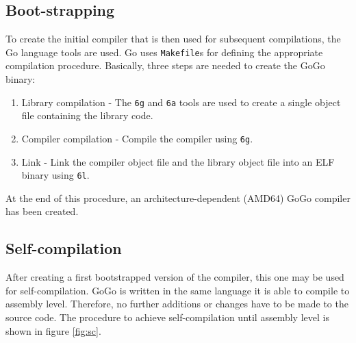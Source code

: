 \documentclass[a4paper]{scrartcl}
\let\section\subsection
\let\subsection\subsubsection
\let\subsubsection\paragraph
\let\paragraph\subparagraph
\let\subparagraph\undefined
\begin{document}
    \section{Boot-strapping}
      To create the initial compiler that is then used for subsequent 
      compilations, the Go language tools are used. Go uses \texttt{Makefile}s 
      for defining the appropriate compilation procedure. Basically, three steps 
      are needed to create the GoGo binary:      
      \begin{enumerate}
        \item Library compilation - The \texttt{6g} and \texttt{6a} tools are
          used to create a single object file containing the library code.
        \item Compiler compilation - Compile the compiler using \texttt{6g}.
        \item Link - Link the compiler object file and the library object file
          into an ELF binary using \texttt{6l}.
      \end{enumerate}
      At the end of this procedure, an architecture-dependent (AMD64) GoGo
     compiler has been created.

    \section{Self-compilation}
    \label{sec:sc}
      After creating a first bootstrapped version of the compiler, this one may
      be used for self-compilation. GoGo is written in the same language it 
      is able to compile to assembly level. Therefore, no further additions
      or changes have to be made to the source code.
      The procedure to achieve self-compilation until assembly level is shown
      in figure \ref{fig:sc}.
\end{document}
